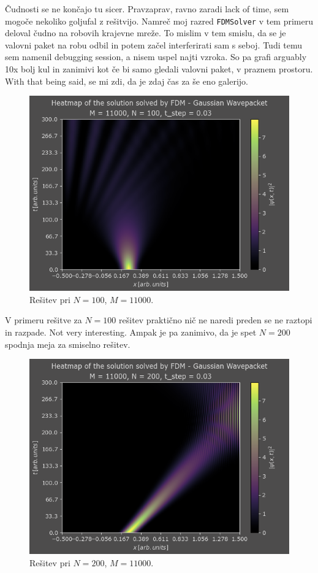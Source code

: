 \documentclass[a4paper]{article}
\begin{document}
Čudnosti se ne končajo tu sicer. Pravzaprav, ravno zaradi lack of time, sem mogoče nekoliko goljufal
z rešitvijo. Namreč moj razred \texttt{FDMSolver} v tem primeru deloval čudno na robovih krajevne mreže.
To mislim v tem smislu, da se je valovni paket na robu odbil in potem začel interferirati sam s seboj.
Tudi temu sem namenil debugging session, a nisem uspel najti vzroka. So pa grafi arguably 10x bolj
kul in zanimivi kot če bi samo gledali valovni paket, v praznem prostoru. With that being said,
se mi zdi, da je zdaj čas za še eno galerijo.

\begin{figure}[H]
    \centering
    \includegraphics[width=\textwidth]{./images/case2_N100.png}
    \caption{Rešitev pri $N=100$, $M=11000$.}
\end{figure}

V primeru rešitve za $N=100$ rešitev praktično nič ne naredi preden se ne raztopi in razpade. Not 
very interesting. Ampak je pa zanimivo, da je spet $N=200$ spodnja meja za smiselno rešitev.

\begin{figure}[H]
    \centering
    \includegraphics[width=\textwidth]{./images/case2_N200.png}
    \caption{Rešitev pri $N=200$, $M=11000$.}
\end{figure}
\end{document}
